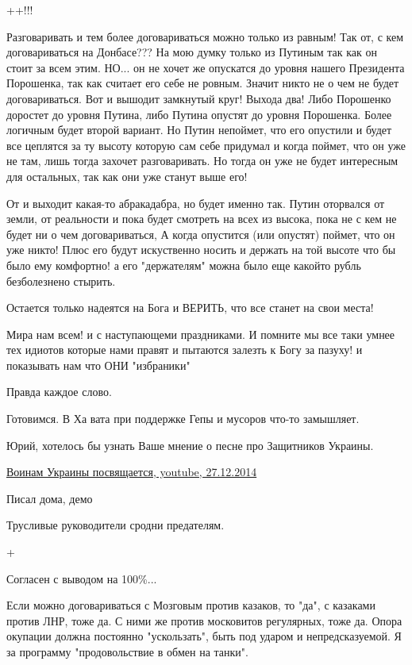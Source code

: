 \begin{itemize}
++!!!


Разговаривать и тем более договариваться можно только из равным! Так от, с кем
договариваться на Донбасе??? На мою думку только из Путиным так как он стоит за
всем этим. НО... он не хочет же опускатся до уровня нашего Президента
Порошенка, так как считает его себе не ровным. Значит никто не о чем не будет
договариваться. Вот и вышодит замкнутый круг! Выхода два! Либо Порошенко
доростет до уровня Путина, либо Путина опустят до уровня Порошенка. Более
логичным будет второй вариант. Но Путин непоймет, что его опустили и будет все
цеплятся за ту высоту которую сам себе придумал и когда поймет, что он уже не
там, лишь тогда захочет разговаривать. Но тогда он уже не будет интересным для
остальных, так как они уже станут выше его!

От и выходит какая-то абракадабра, но будет именно так. Путин оторвался от
земли, от реальности и пока будет смотреть на всех из высока, пока не с кем не
будет ни о чем договариваться, А когда опустится (или опустят) поймет, что он
уже никто! Плюс его будут искуственно носить и держать на той высоте что бы
было ему комфортно! а его "держателям" можна было еще какойто рубль
безболезнено стырить.

Остается только надеятся на Бога и ВЕРИТЬ, что все станет на свои места!

Мира нам всем! и с наступающеми праздниками. И помните мы все таки умнее тех
идиотов которые нами правят и пытаются залезть к Богу за пазуху! и показывать
нам что ОНИ "избраники"

Правда каждое слово.

Готовимся. В Ха вата при поддержке Гепы и мусоров что-то замышляет.

Юрий, хотелось бы узнать Ваше мнение о песне про Защитников Украины. 

\href{https://www.youtube.com/watch?v=Up2chc3ddQQ}{%
Воинам Украины посвящается, youtube, 27.12.2014%
}

Писал дома, демо

Трусливые руководители сродни предателям.

+

Согласен с выводом на 100\%...


Если можно договариваться с Мозговым против казаков, то "да", с казаками против
ЛНР, тоже да. С ними же против московитов регулярных, тоже да. Опора окупации
должна постоянно "ускользать", быть под ударом и непредсказуемой. Я за
программу "продовольствие в обмен на танки".


\end{itemize}
